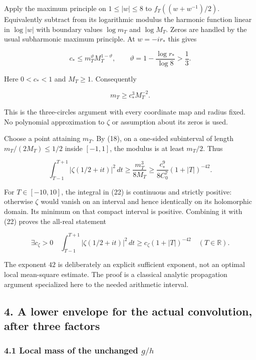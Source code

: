 Apply the maximum principle on \(1\le|w|\le8\) to \(f_T((w+w^{-1})/2)\). Equivalently subtract from its logarithmic modulus the harmonic function linear in \(\log|w|\) with boundary values \(\log m_T\) and \(\log M_T\). Zeros are handled by the usual subharmonic maximum principle. At \(w=-ir_*\) this gives

\[
 c_*\le m_T^{\vartheta}M_T^{1-\vartheta},\qquad
 \vartheta=1-\frac{\log r_*}{\log8}>\frac13.
                                                                         \tag{20}
\]

Here \(0<c_*<1\) and \(M_T\ge1\). Consequently

\[
 m_T\ge c_*^3M_T^{-2}.                                                 \tag{21}
\]

This is the three-circles argument with every coordinate map and radius fixed. No polynomial approximation to \(\zeta\) or assumption about its zeros is used.

Choose a point attaining \(m_T\). By (18), on a one-sided subinterval of length \(m_T/(2M_T)\le1/2\) inside \([-1,1]\), the modulus is at least \(m_T/2\). Thus

\[
 \int_{T-1}^{T+1}|\zeta(1/2+it)|^2\,dt
 \ge \frac{m_T^3}{8M_T}
 \ge \frac{c_*^9}{8C_0^7}(1+|T|)^{-42}.                                \tag{22}
\]

For \(T\in[-10,10]\), the integral in (22) is continuous and strictly positive: otherwise \(\zeta\) would vanish on an interval and hence identically on its holomorphic domain. Its minimum on that compact interval is positive. Combining it with (22) proves the all-real statement

\[
 \boxed{\exists c_\zeta>0\quad
 \int_{T-1}^{T+1}|\zeta(1/2+it)|^2\,dt
 \ge c_\zeta(1+|T|)^{-42}\quad(T\in\mathbb R).}                         \tag{23}
\]

The exponent \(42\) is deliberately an explicit sufficient exponent, not an optimal local mean-square estimate. The proof is a classical analytic propagation argument specialized here to the needed arithmetic interval.

\subsection{4. A lower envelope for the actual convolution, after three factors}\label{zlm:endpoint-arithmetic_original--a-lower-envelope-for-the-actual-convolution-after-three-factors}

\subsubsection{\texorpdfstring{4.1 Local mass of the unchanged \(g/h\)}{4.1 Local mass of the unchanged }}\label{zlm:endpoint-arithmetic_original--local-mass-of-the-unchanged-gh}


